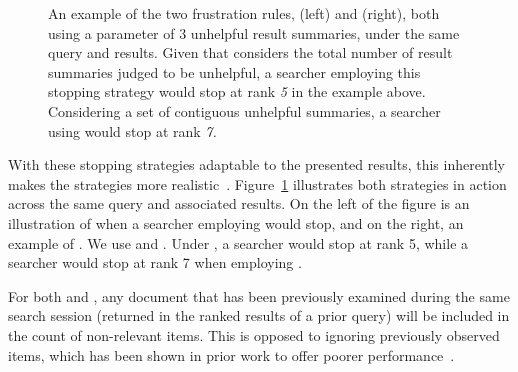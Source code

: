 \begin{figure}[t!]
    \centering
    \caption[Examples of frustration rules  and ]{An example of the two frustration rules,  (left) and  (right), both using a parameter of 3 unhelpful result summaries, under the same query and results. Given that  considers the total number of result summaries judged to be unhelpful, a searcher employing this stopping strategy would stop at rank \emph{5} in the example above. Considering a set of contiguous unhelpful summaries, a searcher using  would stop at rank \emph{7.}}
    \label{fig:ss23}
\end{figure}

With these stopping strategies adaptable to the presented results, this inherently makes the strategies more realistic~\citep{moffat2013users_versus_models}. Figure~\ref{fig:ss23} illustrates both strategies in action across the same query and associated results. On the left of the figure is an illustration of when a searcher employing  would stop, and on the right, an example of . We use  and . Under , a searcher would stop at rank 5, while a searcher would stop at rank 7 when employing .

For both  and , any document that has been previously examined during the same search session (returned in the ranked results of a prior query) will be included in the count of non-relevant items. This is opposed to ignoring previously observed items, which has been shown in prior work to offer poorer performance~\citep{maxwell2015stopping_strategies}.

